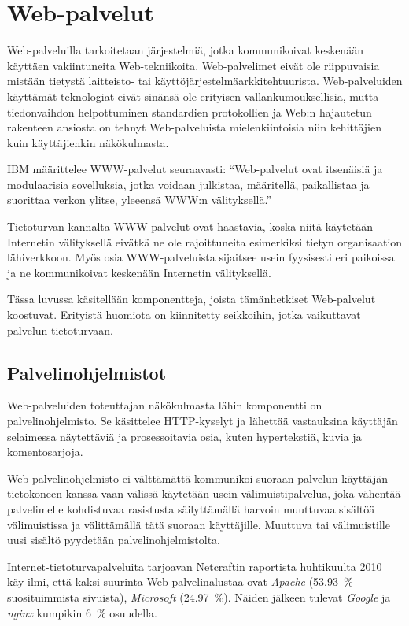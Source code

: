 
\chapter{Web-palvelut}

Web-palveluilla tarkoitetaan järjestelmiä, jotka kommunikoivat
keskenään käyttäen vakiintuneita Web-tekniikoita. Web-palvelimet eivät
ole riippuvaisia mistään tietystä laitteisto- tai
käyttöjärjestelmäarkkitehtuurista. Web-palveluiden käyttämät
teknologiat eivät sinänsä ole erityisen vallankumouksellisia, mutta
tiedonvaihdon helpottuminen standardien protokollien ja Web:n
hajautetun rakenteen ansiosta on tehnyt Web-palveluista
mielenkiintoisia niin kehittäjien kuin käyttäjienkin
näkökulmasta\cite{javaweb}.

IBM määrittelee WWW-palvelut seuraavasti: ``Web-palvelut ovat
itsenäisiä ja modulaarisia sovelluksia, jotka voidaan julkistaa,
määritellä, paikallistaa ja suorittaa verkon ylitse, yleeensä WWW:n
välityksellä.''\cite[s.4]{websecurity}

Tietoturvan kannalta WWW-palvelut ovat haastavia, koska niitä
käytetään Internetin välityksellä eivätkä ne ole rajoittuneita
esimerkiksi tietyn organisaation lähiverkkoon. Myös osia
WWW-palveluista sijaitsee usein fyysisesti eri paikoissa ja ne
kommunikoivat keskenään Internetin välityksellä.

Tässa luvussa käsitellään komponentteja, joista tämänhetkiset
Web-palvelut koostuvat. Erityistä huomiota on kiinnitetty seikkoihin,
jotka vaikuttavat palvelun tietoturvaan.

\section{Palvelinohjelmistot}

Web-palveluiden toteuttajan näkökulmasta lähin komponentti on
palvelinohjelmisto. Se käsittelee HTTP-kyselyt ja lähettää vastauksina
käyttäjän selaimessa näytettäviä ja prosessoitavia osia, kuten
hypertekstiä, kuvia ja komentosarjoja.

Web-palvelinohjelmisto ei välttämättä kommunikoi suoraan palvelun
käyttäjän tietokoneen kanssa vaan välissä käytetään usein välimuistipalvelua,
joka vähentää palvelimelle kohdistuvaa rasistusta säilyttämällä
harvoin muuttuvaa sisältöä välimuistissa ja välittämällä tätä suoraan
käyttäjille. Muuttuva tai välimuistille uusi sisältö pyydetään
palvelinohjelmistolta.

Internet-tietoturvapalveluita tarjoavan Netcraftin raportista
huhtikuulta 2010~\cite{netcraft} käy ilmi, että kaksi suurinta
Web-palvelinalustaa ovat \textit{Apache} (53.93~\% suosituimmista sivuista),
\textit{Microsoft} (24.97~\%). Näiden jälkeen tulevat \textit{Google} ja \textit{nginx} kumpikin
6~\% osuudella.


